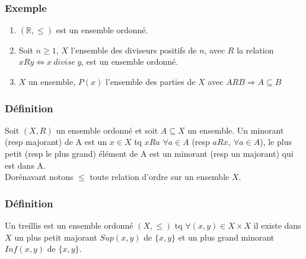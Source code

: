 \documentclass[a4paper, oneside]{report}
\newcommand{\x}{\times}
\newcommand{\R}{\mathbb{R}}
\begin{document}
\subsubsection{Exemple}
\begin{enumerate}
\item $(\R,\leq )$ est un ensemble ordonné.
\item Soit $n\geq 1$, $X$ l'ensemble des diviseurs positifs de $n$, avec $R$ la relation $xRy \Leftrightarrow x~divise~y$, est un ensemble ordonné.\\
\item $X$ un ensemble, $P(x)$ l'ensemble des parties de $X$ avec $ARB\Rightarrow A\subseteq B$
\end{enumerate}

\subsubsection{Définition}
Soit $(X,R)$ un ensemble ordonné et soit $A\subseteq X$ un ensemble. Un minorant (resp majorant) de A est un $x\in X$ tq $xRa$ $\forall a \in A$ (resp $aRx,~\forall a\in A$), le plus petit (resp le plus grand) élément de A est un minorant (resp un majorant) qui est dans A.\\

Dorénavant notons $\leq $ toute relation d'ordre sur un ensemble $X$.\\

\subsubsection{Définition}
Un treillis est un ensemble ordonné $(X, \leq )$ tq $\forall (x,y)\in X\x X$ il existe dans $X$ un plus petit majorant $Sup(x,y)$ de $\{x,y\}$ et un plus grand minorant $Inf(x,y)$ de $\{x,y\}$.
\end{document}
